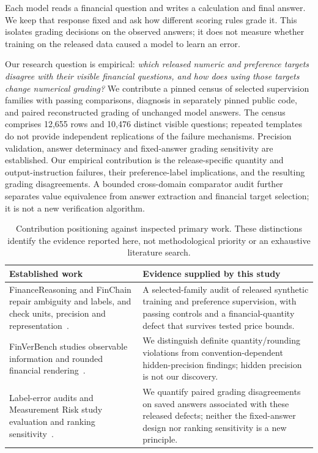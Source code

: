 Each model reads a financial question and writes a calculation and final answer. We keep that response fixed and ask how different scoring rules grade it. This isolates grading decisions on the observed
answers; it does not measure whether training on the released data caused a model to learn an error.

Our research question is empirical: \emph{which released numeric and preference targets disagree with their visible financial questions, and how does using those targets change numerical grading?} We contribute
a pinned census of selected supervision families with passing comparisons, diagnosis in separately pinned public code, and paired reconstructed grading of unchanged model answers. The census comprises 12,655 rows and 10,476 distinct visible questions; repeated templates do not provide independent replications of the failure mechanisms. Precision validation, answer determinacy and fixed-answer grading sensitivity are established. Our empirical contribution is the release-specific quantity and output-instruction failures, their preference-label implications, and the resulting grading disagreements. A bounded cross-domain comparator audit further separates value equivalence from answer extraction and financial target selection; it is not a new verification algorithm.

\begin{table}[!ht]
\centering\small
\begin{tabular}{p{.45\linewidth}p{.47\linewidth}}
\toprule
Established work & Evidence supplied by this study\\
\midrule
FinanceReasoning and FinChain repair ambiguity and labels, and check units, precision and representation~\cite{financereasoning,finchain}. & A selected-family audit of released synthetic training and preference supervision, with passing controls and a financial-quantity defect that survives tested price bounds.\\
FinVerBench studies observable information and rounded financial rendering~\cite{finverbench}. & We distinguish definite quantity/rounding violations from convention-dependent hidden-precision findings; hidden precision is not our discovery.\\
Label-error audits and Measurement Risk study evaluation and ranking sensitivity~\cite{labelerrors,measurementrisk}. & We quantify paired grading disagreements on saved answers associated with these released defects; neither the fixed-answer design nor ranking sensitivity is a new principle.\\
\bottomrule
\end{tabular}
\caption{Contribution positioning against inspected primary work. These distinctions identify the evidence reported here, not methodological priority or an exhaustive literature search.}
\label{tab:positioning}
\end{table}


